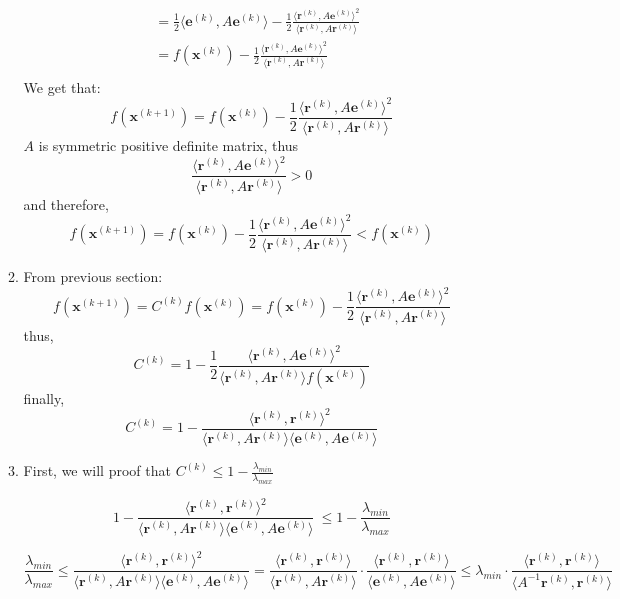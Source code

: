 \documentclass{article}
\begin{document}
\begin{enumerate}[(a)]
\begin{enumerate}[label=(\roman*)]
\begin{align*}
&= \frac{1}{2}\langle\mathbf{e}^{(k)}, A\mathbf{e}^{(k)}\rangle - \frac{1}{2}\frac{\langle\mathbf{r}^{(k)}, A\mathbf{e}^{(k)}\rangle^2}{\langle\mathbf{r}^{(k)}, A\mathbf{r}^{(k)}\rangle}\\
&= f(\mathbf{x}^{(k)}) - \frac{1}{2}\frac{\langle\mathbf{r}^{(k)}, A\mathbf{e}^{(k)}\rangle^2}{\langle\mathbf{r}^{(k)}, A\mathbf{r}^{(k)}\rangle}\\
\end{align*}
We get that:
\[f(\mathbf{x}^{(k+1)}) = f(\mathbf{x}^{(k)}) - \frac{1}{2}\frac{\langle\mathbf{r}^{(k)}, A\mathbf{e}^{(k)}\rangle^2}{\langle\mathbf{r}^{(k)}, A\mathbf{r}^{(k)}\rangle}\]
$A$ is symmetric positive definite matrix, thus
\[\frac{\langle\mathbf{r}^{(k)}, A\mathbf{e}^{(k)}\rangle^2}{\langle\mathbf{r}^{(k)}, A\mathbf{r}^{(k)}\rangle}>0\]
and therefore,
\[f(\mathbf{x}^{(k+1)}) = f(\mathbf{x}^{(k)}) - \frac{1}{2}\frac{\langle\mathbf{r}^{(k)}, A\mathbf{e}^{(k)}\rangle^2}{\langle\mathbf{r}^{(k)}, A\mathbf{r}^{(k)}\rangle} <  f(\mathbf{x}^{(k)})\]
\item From previous section:
\[f(\mathbf{x}^{(k+1)}) = C^{(k)} f(\mathbf{x}^{(k)}) = f(\mathbf{x}^{(k)}) - \frac{1}{2}\frac{\langle\mathbf{r}^{(k)}, A\mathbf{e}^{(k)}\rangle^2}{\langle\mathbf{r}^{(k)}, A\mathbf{r}^{(k)}\rangle} \]
thus,
\[C^{(k)} = 1- \frac{1}{2}\frac{\langle\mathbf{r}^{(k)}, A\mathbf{e}^{(k)}\rangle^2}{\langle\mathbf{r}^{(k)}, A\mathbf{r}^{(k)}\rangle f(\mathbf{x}^{(k)})}\]
finally,
\[C^{(k)} = 1- \frac{\langle\mathbf{r}^{(k)}, \mathbf{r}^{(k)}\rangle^2}{\langle\mathbf{r}^{(k)}, A\mathbf{r}^{(k)}\rangle \langle \mathbf{e}^{(k)}, A\mathbf{e}^{(k)}\rangle}\]
\item First, we will proof that $C^{(k)} \leq 1-\frac{\lambda_{min}} {\lambda_{max}}$

\[1- \frac{\langle\mathbf{r}^{(k)}, \mathbf{r}^{(k)}\rangle^2}{\langle\mathbf{r}^{(k)}, A\mathbf{r}^{(k)}\rangle \langle \mathbf{e}^{(k)}, A\mathbf{e}^{(k)}\rangle}\ \leq 1-\frac{\lambda_{min}} {\lambda_{max}}\]

\[
\frac{\lambda_{min}} {\lambda_{max}} \leq \frac{\langle\mathbf{r}^{(k)}, \mathbf{r}^{(k)}\rangle^2}{\langle\mathbf{r}^{(k)}, A\mathbf{r}^{(k)}\rangle \langle \mathbf{e}^{(k)}, A\mathbf{e}^{(k)}\rangle} = \frac{\langle\mathbf{r}^{(k)}, \mathbf{r}^{(k)}\rangle}{\langle\mathbf{r}^{(k)}, A \mathbf{r}^{(k)}\rangle} \cdot \frac{\langle\mathbf{r}^{(k)}, \mathbf{r}^{(k)}\rangle}{\langle\mathbf{e}^{(k)}, A\mathbf{e}^{(k)}\rangle} \leq \lambda_{min} \cdot \frac{\langle\mathbf{r}^{(k)}, \mathbf{r}^{(k)}\rangle}{\langle A^{-1}\mathbf{r}^{(k)}, \mathbf{r}^{(k)}\rangle}\]


\end{enumerate}
\end{enumerate}
\end{document}
